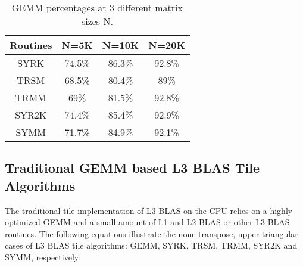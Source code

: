 \documentclass[conference]{IEEEtran}
\begin{document}
\begin{table}[!t]
\caption{GEMM percentages at 3 different matrix sizes N.}
\centering
\label{GEMM_Percentages}
\begin{tabular}{c c c c}
    \toprule
    \textbf{Routines} & \textbf{N=5K} & \textbf{N=10K} & \textbf{N=20K} \\ \midrule
      SYRK            &      74.5\%         &       86.3\%        &   92.8\%  \\
      TRSM            &      68.5\%         &       80.4\%        &    89\%   \\
      TRMM            &       69\%          &       81.5\%        &   92.8\%  \\
      SYR2K           &      74.4\%         &       85.4\%        &   92.9\%  \\
      SYMM            &      71.7\%         &       84.9\%        &   92.1\%  \\ \bottomrule
\end{tabular}
\vspace{-0.15in}
\end{table}

\vspace{-0.12in}
\subsection{Traditional GEMM based L3 BLAS Tile Algorithms}
\vspace{-0.05in}
The traditional tile implementation of L3 BLAS on the CPU relies on a highly optimized GEMM and a small amount 
of L1 and L2 BLAS \cite{Goto} or other L3 BLAS routines. The following equations illustrate the none-transpose, upper 
triangular cases of L3 BLAS tile algorithms: GEMM, SYRK, TRSM, TRMM, SYR2K and SYMM, respectively:
\end{document}
